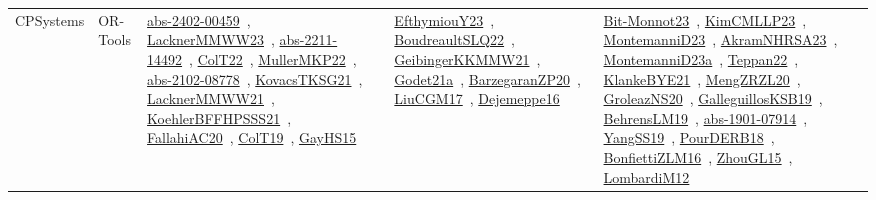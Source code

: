 {\begin{longtable}{lp{3cm}>{\raggedright\arraybackslash}p{6cm}>{\raggedright\arraybackslash}p{6cm}>{\raggedright\arraybackslash}p{8cm}}
CPSystems & OR-Tools & \href{works/abs-2402-00459.pdf}{abs-2402-00459}~\cite{abs-2402-00459}, \href{works/LacknerMMWW23.pdf}{LacknerMMWW23}~\cite{LacknerMMWW23}, \href{works/abs-2211-14492.pdf}{abs-2211-14492}~\cite{abs-2211-14492}, \href{works/ColT22.pdf}{ColT22}~\cite{ColT22}, \href{works/MullerMKP22.pdf}{MullerMKP22}~\cite{MullerMKP22}, \href{works/abs-2102-08778.pdf}{abs-2102-08778}~\cite{abs-2102-08778}, \href{works/KovacsTKSG21.pdf}{KovacsTKSG21}~\cite{KovacsTKSG21}, \href{works/LacknerMMWW21.pdf}{LacknerMMWW21}~\cite{LacknerMMWW21}, \href{works/KoehlerBFFHPSSS21.pdf}{KoehlerBFFHPSSS21}~\cite{KoehlerBFFHPSSS21}, \href{works/FallahiAC20.pdf}{FallahiAC20}~\cite{FallahiAC20}, \href{works/ColT19.pdf}{ColT19}~\cite{ColT19}, \href{works/GayHS15.pdf}{GayHS15}~\cite{GayHS15} & \href{works/EfthymiouY23.pdf}{EfthymiouY23}~\cite{EfthymiouY23}, \href{works/BoudreaultSLQ22.pdf}{BoudreaultSLQ22}~\cite{BoudreaultSLQ22}, \href{works/GeibingerKKMMW21.pdf}{GeibingerKKMMW21}~\cite{GeibingerKKMMW21}, \href{works/Godet21a.pdf}{Godet21a}~\cite{Godet21a}, \href{works/BarzegaranZP20.pdf}{BarzegaranZP20}~\cite{BarzegaranZP20}, \href{works/LiuCGM17.pdf}{LiuCGM17}~\cite{LiuCGM17}, \href{works/Dejemeppe16.pdf}{Dejemeppe16}~\cite{Dejemeppe16} & \href{works/Bit-Monnot23.pdf}{Bit-Monnot23}~\cite{Bit-Monnot23}, \href{works/KimCMLLP23.pdf}{KimCMLLP23}~\cite{KimCMLLP23}, \href{works/MontemanniD23.pdf}{MontemanniD23}~\cite{MontemanniD23}, \href{works/AkramNHRSA23.pdf}{AkramNHRSA23}~\cite{AkramNHRSA23}, \href{works/MontemanniD23a.pdf}{MontemanniD23a}~\cite{MontemanniD23a}, \href{works/Teppan22.pdf}{Teppan22}~\cite{Teppan22}, \href{works/KlankeBYE21.pdf}{KlankeBYE21}~\cite{KlankeBYE21}, \href{works/MengZRZL20.pdf}{MengZRZL20}~\cite{MengZRZL20}, \href{works/GroleazNS20.pdf}{GroleazNS20}~\cite{GroleazNS20}, \href{works/GalleguillosKSB19.pdf}{GalleguillosKSB19}~\cite{GalleguillosKSB19}, \href{works/BehrensLM19.pdf}{BehrensLM19}~\cite{BehrensLM19}, \href{works/abs-1901-07914.pdf}{abs-1901-07914}~\cite{abs-1901-07914}, \href{works/YangSS19.pdf}{YangSS19}~\cite{YangSS19}, \href{works/PourDERB18.pdf}{PourDERB18}~\cite{PourDERB18}, \href{works/BonfiettiZLM16.pdf}{BonfiettiZLM16}~\cite{BonfiettiZLM16}, \href{works/ZhouGL15.pdf}{ZhouGL15}~\cite{ZhouGL15}, \href{works/LombardiM12.pdf}{LombardiM12}~\cite{LombardiM12}\\

\end{longtable}}
